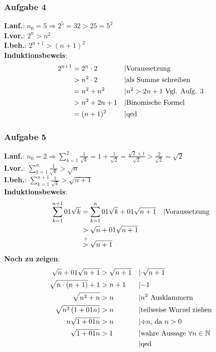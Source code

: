 \subsubsection{Aufgabe 4}
\textbf{I.anf.}: $ n_0 = 5 \Rightarrow 2^5 = 32 > 25 = 5^2$\\
\textbf{I.vor.}: $ 2^n > n^2 $\\
\textbf{I.beh.}: $ 2^{n+1} > (n+1)^2 $\\
\textbf{Induktionsbeweis}: \begin{align*}
2^{n+1} &= 2^n \cdot 2 && \text{\textbar Voraussetzung}\\
				&> n^2 \cdot 2 && \text{\textbar als Summe schreiben}\\
				&= n^2 + n^2&& \text{\textbar $n^2>2n+1$ Vgl. Aufg. 3}\\
				&> n^2 + 2n + 1 && \text{\textbar Binomische Formel}\\
				&= (n+1)^2 && \text{\textbar qed}\end{align*}	
\subsubsection{Aufgabe 5}
\textbf{I.anf.}: $ n_0 = 2 \Rightarrow \sum_{k=1}^2 \frac{1}{\sqrt{k}} = 1 + \frac{1}{\sqrt{2}} = \frac{\sqrt{2}+1}{\sqrt{2}} > \frac{2}{\sqrt{2}} = \sqrt{2} $\\
\textbf{I.vor.}: $\sum_{k=1}^n \frac{1}{\sqrt{k}} > \sqrt{n} $\\
\textbf{I.beh.}: $\sum_{k=1}^{n+1} \frac{1}{\sqrt{k}} > \sqrt{n+1} $\\
\textbf{Induktionsbeweis}: \begin{align*}
\sum_{k=1}^{n+1} \frac{1}{\sqrt{k}} &= \sum_{k=1}^n \frac{1}{\sqrt{k}} + \frac{1}{\sqrt{n+1}} && \text{\textbar Voraussetzung}\\
																		&> \sqrt{n} + \frac{1}{\sqrt{n+1}} \\
																		&\stackrel{?}{>} \sqrt{n+1} \end{align*}
\textbf{Noch zu zeigen}:\begin{align*} 
\sqrt{n} + \frac{1}{\sqrt{n+1}} &> \sqrt{n+1} && \text{\textbar $\cdot \sqrt{n+1}$}\\
\sqrt{n \cdot (n+1)} + 1 				&> n+1 && \text{\textbar $-1$}\\
\sqrt{n^2 + n} 									&> n		&& \text{\textbar $n^2$ Ausklammern}\\ 	
\sqrt{n^2\left(1+\frac{1}{n}\right)}				&> n		&& \text{\textbar teilweise Wurzel ziehen}\\
n\sqrt{1+\frac{1}{n}}						&> n		&& \text{\textbar $\div n$, da $n>0$}\\
\sqrt{1+\frac{1}{n}}						&> 1		&& \text{\textbar wahre Aussage $\forall n \in \mathbb{N}$}\\
&																				&& \text{\textbar qed}\end{align*}
